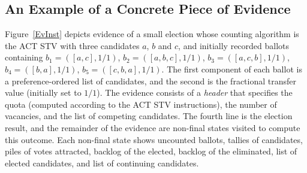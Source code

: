 \documentclass[10pt,conference]{IEEEtran}
\begin{document}
 \subsection{An Example of a Concrete Piece of Evidence}
\label{subsec:InstEv}
Figure~\ref{EvInst} depicts evidence of a small election whose counting algorithm is the ACT STV 
with three candidates $a$, $b$ and $c$, and initially recorded ballots containing
$b_1=([a,c],1/1)$, $b_2=([a,b,c],1/1)$, $b_3=([a,c,b],1/1)$,
$b_4=([b,a],1/1)$, $b_5=([c,b,a],1/1)$.  The first component of each ballot is a preference-ordered list of candidates, and the second is the fractional transfer value (initially set to $1/1$). The evidence consists of a \emph{header} that specifies the quota (computed according to the ACT STV instructions), the number of vacancies, and the list of competing candidates. 
The fourth line is the election result, and the remainder of the evidence are non-final states visited to compute this
outcome. Each non-final state shows uncounted ballots, tallies of candidates, piles of votes attracted, backlog of the elected, backlog of the eliminated, list of elected candidates, and list of continuing candidates. 
\end{document}
